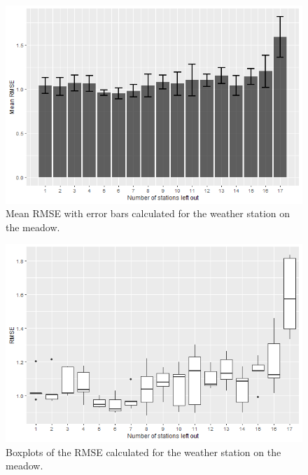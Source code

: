 \documentclass[5p]{elsarticle} %
\begin{document}
\begin{figure}[!ht]
\begin{center}
\includegraphics[scale=0.48]{rmse_wiese_mean_barplot}
\caption{Mean RMSE with error bars calculated for the weather station on the meadow.}
\end{center}
\end{figure}

\begin{figure}[!h]
\begin{center}

\includegraphics[scale = 0.48]{rmse_wiese_boxplot}
\caption{Boxplots of the RMSE calculated for the weather station on the meadow.}
\end{center}
\end{figure}
\end{document}

